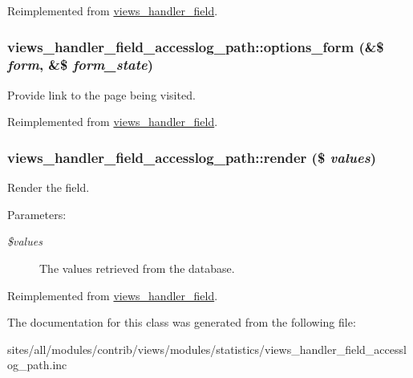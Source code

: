 Reimplemented from \hyperlink{classviews__handler__field_64c69a8a3697603f8283405071c25b76}{views\_\-handler\_\-field}.\hypertarget{classviews__handler__field__accesslog__path_b8bfda464a205057cd730081aa5981c8}{
\subsubsection[{options\_\-form}]{\setlength{\rightskip}{0pt plus 5cm}views\_\-handler\_\-field\_\-accesslog\_\-path::options\_\-form (\&\$ {\em form}, \/  \&\$ {\em form\_\-state})}}
\label{classviews__handler__field__accesslog__path_b8bfda464a205057cd730081aa5981c8}


Provide link to the page being visited. 

Reimplemented from \hyperlink{classviews__handler__field_0435d161922b7b4b84f02a2e79bb947a}{views\_\-handler\_\-field}.\hypertarget{classviews__handler__field__accesslog__path_b40b3461a6c122c052753537346089b1}{
\subsubsection[{render}]{\setlength{\rightskip}{0pt plus 5cm}views\_\-handler\_\-field\_\-accesslog\_\-path::render (\$ {\em values})}}
\label{classviews__handler__field__accesslog__path_b40b3461a6c122c052753537346089b1}


Render the field.

\begin{Desc}
\item[Parameters:]
\begin{description}
\item[{\em \$values}]The values retrieved from the database. \end{description}
\end{Desc}


Reimplemented from \hyperlink{classviews__handler__field_82ff951c5e9ceb97b2eab86f880cbc1e}{views\_\-handler\_\-field}.

The documentation for this class was generated from the following file:\begin{CompactItemize}
\item 
sites/all/modules/contrib/views/modules/statistics/views\_\-handler\_\-field\_\-accesslog\_\-path.inc\end{CompactItemize}
